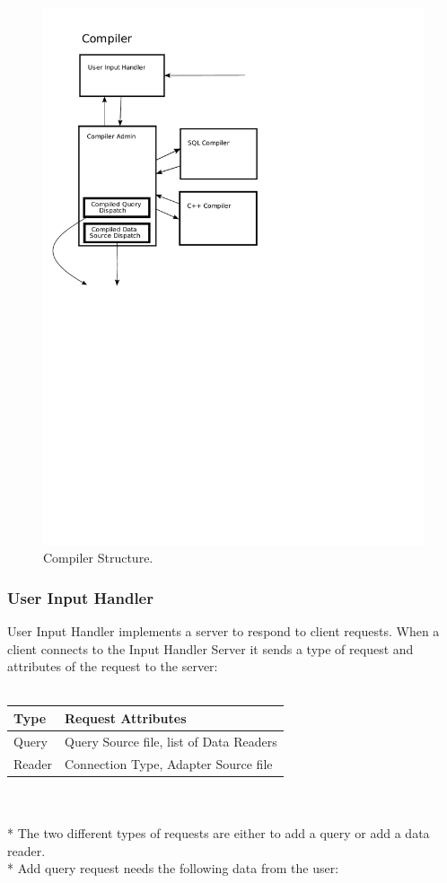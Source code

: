 \documentclass[11pt]{article}
\begin{document}
\begin{figure}
  \includegraphics[width=4.50in]{../figures/compiler.pdf}
  \caption{Compiler Structure.}
  \label{CompilerPicture}
\end{figure}

\subsubsection{User Input Handler}
User Input Handler implements a server to respond to client requests. When a client connects to the Input Handler Server it sends a type of request and attributes of the request to the server:
\\
\\
\begin{tabular}{|l|l|}
  \hline
  Type & Request Attributes \\ \hline
  Query & Query Source file, list of Data Readers \\ \hline
  Reader & Connection Type, Adapter Source file \\ \hline
\end{tabular}
\\
\\*
The two different types of requests are either to add a query or add a data reader.
\\*
Add query request needs the following data from the user:
\end{document}
